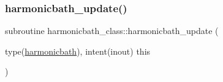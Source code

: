 \subsubsection{\texorpdfstring{harmonicbath\+\_\+update()}{harmonicbath\_update()}}
{\footnotesize\ttfamily subroutine harmonicbath\+\_\+class\+::harmonicbath\+\_\+update (\begin{DoxyParamCaption}\item[{type(\hyperlink{structharmonicbath__class_1_1harmonicbath}{harmonicbath}), intent(inout)}]{this }\end{DoxyParamCaption})\hspace{0.3cm}{\ttfamily [private]}}

